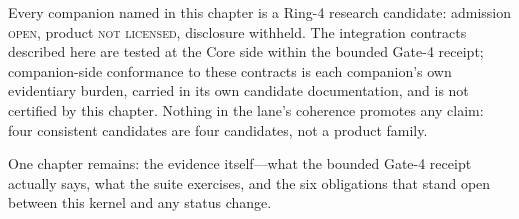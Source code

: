 \begin{boundary}\label{integ:bd:status}
Every companion named in this chapter is a Ring-4 research candidate: admission \textsc{open}, product \textsc{not licensed}, disclosure withheld. The integration contracts described here are tested at the Core side within the bounded Gate-4 receipt; companion-side conformance to these contracts is each companion's own evidentiary burden, carried in its own candidate documentation, and is not certified by this chapter. Nothing in the lane's coherence promotes any claim: four consistent candidates are four candidates, not a product family.
\end{boundary}

One chapter remains: the evidence itself---what the bounded Gate-4 receipt actually says, what the suite exercises, and the six obligations that stand open between this kernel and any status change.
